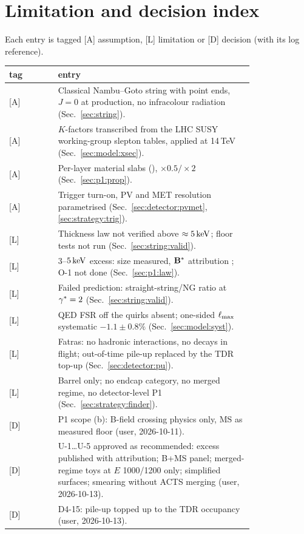 \section{Limitation and decision index}\label{app:limits}

Each entry is tagged [A] assumption, [L] limitation or [D] decision (with its log reference). 

\begin{center}
\scriptsize
\begin{longtable}{lp{0.80\linewidth}}
\toprule
tag & entry\\
\midrule
\endhead
{[A]} & Classical Nambu--Goto string with point ends, $J=0$ at production, no infracolour radiation (Sec.~\ref{sec:string}).\\
{[A]} & $K$-factors transcribed from the LHC SUSY working-group slepton tables, applied at 14\,TeV (Sec.~\ref{sec:model:xsec}).\\
{[A]} & Per-layer material slabs (\UNV{}), $\times0.5/\times2$ (Sec.~\ref{sec:p1:prop}).\\
{[A]} & Trigger turn-on, PV and MET resolution parametrised (Sec.~\ref{sec:detector:pvmet}, \ref{sec:strategy:trig}).\\
{[L]} & Thickness law not verified above $\approx5\,\mathrm{keV}$; floor tests not run (Sec.~\ref{sec:string:valid}).\\
{[L]} & $3$--$5\,\mathrm{keV}$ excess: size measured, $\mathbf{B}^*$ attribution \EST{}; O-1 not done (Sec.~\ref{sec:p1:law}).\\
{[L]} & Failed prediction: straight-string/NG ratio at $\gamma^*=2$ (Sec.~\ref{sec:string:valid}).\\
{[L]} & QED FSR off the quirks absent; one-sided $\ell_{\max}$ systematic $-1.1\pm0.8\%$ (Sec.~\ref{sec:model:syst}).\\
{[L]} & Fatras: no hadronic interactions, no decays in flight; out-of-time pile-up replaced by the TDR top-up (Sec.~\ref{sec:detector:pu}).\\
{[L]} & Barrel only; no endcap category, no merged regime, no detector-level P1 (Sec.~\ref{sec:strategy:finder}).\\
{[D]} & P1 scope (b): B-field crossing physics only, MS as measured floor (user, 2026-10-11).\\
{[D]} & U-1\ldots U-5 approved as recommended: excess published with \EST{} attribution; B+MS panel; merged-regime toys
      at $E$ 1000/1200 only; simplified surfaces; smearing without ACTS merging (user, 2026-10-13).\\
{[D]} & D4-15: pile-up topped up to the TDR occupancy (user, 2026-10-13).\\

\end{longtable}
\end{center}
